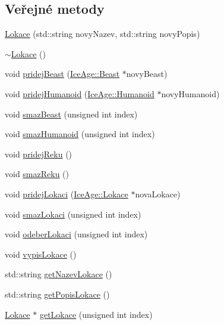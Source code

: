 \subsection*{Veřejné metody}
\begin{DoxyCompactItemize}
\item 
\hyperlink{classIceAge_1_1Lokace_ac8c6fe0d55e08b16e7f220b4aa969bf9}{Lokace} (std\+::string novy\+Nazev, std\+::string novy\+Popis)
\item 
\hyperlink{classIceAge_1_1Lokace_ad4160c5054d271837582fe4030c40989}{$\sim$\+Lokace} ()
\item 
void \hyperlink{classIceAge_1_1Lokace_ae77a73c9d4ca11a4ccbd056e80e68318}{pridej\+Beast} (\hyperlink{classIceAge_1_1Beast}{Ice\+Age\+::\+Beast} $\ast$novy\+Beast)
\item 
void \hyperlink{classIceAge_1_1Lokace_ab8da7a4fa629d827d0b633c67d65da4e}{pridej\+Humanoid} (\hyperlink{classIceAge_1_1Humanoid}{Ice\+Age\+::\+Humanoid} $\ast$novy\+Humanoid)
\item 
void \hyperlink{classIceAge_1_1Lokace_a7de7eb0ffccd14cc461788a987545ba8}{smaz\+Beast} (unsigned int index)
\item 
void \hyperlink{classIceAge_1_1Lokace_ab81171b69a39d471ad316afac9035309}{smaz\+Humanoid} (unsigned int index)
\item 
void \hyperlink{classIceAge_1_1Lokace_a5b8cba97ec44efafc0b105a3b487284c}{pridej\+Reku} ()
\item 
void \hyperlink{classIceAge_1_1Lokace_aa7917baa3393a5d5ed806a5f23143fa7}{smaz\+Reku} ()
\item 
void \hyperlink{classIceAge_1_1Lokace_a0d506324f571f77f0daf14de00c548b6}{pridej\+Lokaci} (\hyperlink{classIceAge_1_1Lokace}{Ice\+Age\+::\+Lokace} $\ast$nova\+Lokace)
\item 
void \hyperlink{classIceAge_1_1Lokace_ad854c0c977792922f8ede422229658f9}{smaz\+Lokaci} (unsigned int index)
\item 
void \hyperlink{classIceAge_1_1Lokace_a1f5564ad6a602f649e9b86e0e6c77815}{odeber\+Lokaci} (unsigned int index)
\item 
void \hyperlink{classIceAge_1_1Lokace_af4a779823955954dd2c68331a57193c9}{vypis\+Lokace} ()
\item 
std\+::string \hyperlink{classIceAge_1_1Lokace_aa7add7f42af4af1a13ca246f8d5081c6}{get\+Nazev\+Lokace} ()
\item 
std\+::string \hyperlink{classIceAge_1_1Lokace_adf9674c5770d15fb41bd54207169e464}{get\+Popis\+Lokace} ()
\item 
\hyperlink{classIceAge_1_1Lokace}{Lokace} $\ast$ \hyperlink{classIceAge_1_1Lokace_aff2c363fd3d4b7727aff3a5c80980710}{get\+Lokace} (unsigned int index)

\end{DoxyCompactItemize}
